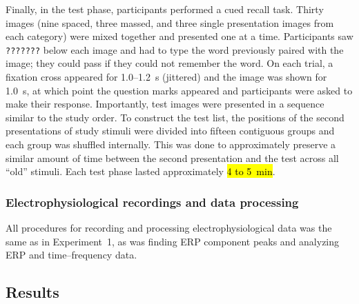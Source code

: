 
Finally, in the test phase, participants performed a cued recall task.  Thirty images (nine spaced, three massed, and three single presentation images from each category) were mixed together and presented one at a time.  Participants saw \texttt{???????} below each image and had to type the word previously paired with the image; they could pass if they could not remember the word.  On each trial, a fixation cross appeared for 1.0--1.2~s (jittered) and the image was shown for 1.0~s, at which point the question marks appeared and participants were asked to make their response.  Importantly, test images were presented in a sequence similar to the study order.  To construct the test list, the positions of the second presentations of study stimuli were divided into fifteen contiguous groups and each group was shuffled internally.  This was done to approximately preserve a similar amount of time between the second presentation and the test across all ``old'' stimuli.  Each test phase lasted approximately \hl{4 to 5~min}.



\subsubsection{Electrophysiological recordings and data processing}

All procedures for recording and processing electrophysiological data was the same as in Experiment~1, as was finding ERP component peaks and analyzing ERP and time--frequency data.

\subsection{Results}



